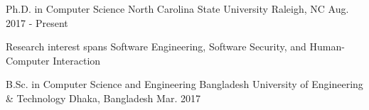 \begin{cventries}
    \cventry
    {Ph.D. in Computer Science}
    {North Carolina State University}
    {Raleigh, NC}
    {Aug. 2017 - Present}
    {
      \begin{cvitems}
        \item {Research interest spans Software Engineering, Software Security, and Human-Computer Interaction}
      \end{cvitems}
    }
  \cventry
    {B.Sc. in Computer Science and Engineering}
    {Bangladesh University of Engineering \& Technology}
    {Dhaka, Bangladesh}
    {Mar. 2017}
    {
      \begin{cvitems}
      \end{cvitems}
    }
\end{cventries}
